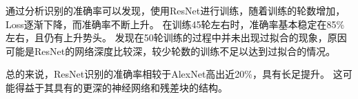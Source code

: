 通过分析识别的准确率可以发现，使用ResNet进行训练，随着训练的轮数增加，Loss逐渐下降，而准确率不断上升。
在训练45轮左右时，准确率基本稳定在85\%左右，且仍有上升势头。
发现在50轮训练的过程中并未出现过拟合的现象，原因可能是ResNet的网络深度比较深，较少轮数的训练不足以达到过拟合的情况。 \par
总的来说，ResNet识别的准确率相较于AlexNet高出近20\%，具有长足提升。
这可能得益于其具有的更深的神经网络和残差块的结构。

